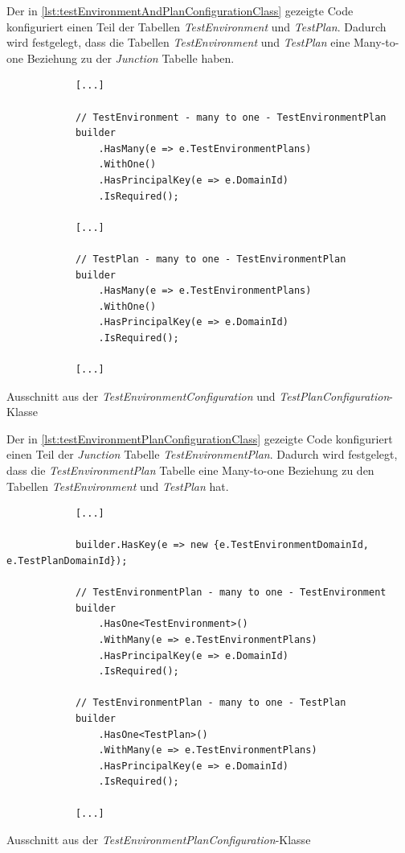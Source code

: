 \documentclass[a4paper, fontsize=11pt, parskip=half, twoside]{scrreprt}
\begin{document}
	Der in \autoref{lst:testEnvironmentAndPlanConfigurationClass} gezeigte Code konfiguriert einen Teil der Tabellen \emph{TestEnvironment} und \emph{TestPlan}.
	Dadurch wird festgelegt, dass die Tabellen \emph{TestEnvironment} und \emph{TestPlan} eine Many-to-one Beziehung zu der \emph{Junction} Tabelle haben.
	
	\begin{listing}[ht]
		\begin{verbatim}
			[...]	
			
			// TestEnvironment - many to one - TestEnvironmentPlan
			builder 
				.HasMany(e => e.TestEnvironmentPlans)
				.WithOne()
				.HasPrincipalKey(e => e.DomainId)
				.IsRequired();
				
			[...]	
			
			// TestPlan - many to one - TestEnvironmentPlan
			builder 
				.HasMany(e => e.TestEnvironmentPlans)
				.WithOne()
				.HasPrincipalKey(e => e.DomainId)
				.IsRequired();	
									
			[...]
		\end{verbatim}
		\caption{Ausschnitt aus der \emph{TestEnvironmentConfiguration} und \emph{TestPlanConfiguration}-Klasse}
		\label{lst:testEnvironmentAndPlanConfigurationClass}
	\end{listing}

	Der in \autoref{lst:testEnvironmentPlanConfigurationClass} gezeigte Code konfiguriert einen Teil der \emph{Junction} Tabelle \emph{TestEnvironmentPlan}.
	Dadurch wird festgelegt, dass die \emph{TestEnvironmentPlan} Tabelle eine Many-to-one Beziehung zu den Tabellen \emph{TestEnvironment} und \emph{TestPlan} hat.

	\newpage

	\begin{listing}[ht]
		\begin{verbatim}
			[...]	
					
			builder.HasKey(e => new {e.TestEnvironmentDomainId, e.TestPlanDomainId});
			
			// TestEnvironmentPlan - many to one - TestEnvironment
			builder 
				.HasOne<TestEnvironment>()
				.WithMany(e => e.TestEnvironmentPlans)
				.HasPrincipalKey(e => e.DomainId)
				.IsRequired();
				
			// TestEnvironmentPlan - many to one - TestPlan
			builder 
				.HasOne<TestPlan>()
				.WithMany(e => e.TestEnvironmentPlans)
				.HasPrincipalKey(e => e.DomainId)
				.IsRequired();	
					
			[...]
		\end{verbatim}
		\caption{Ausschnitt aus der \emph{TestEnvironmentPlanConfiguration}-Klasse}
		\label{lst:testEnvironmentPlanConfigurationClass}
	\end{listing}
	
\end{document}
